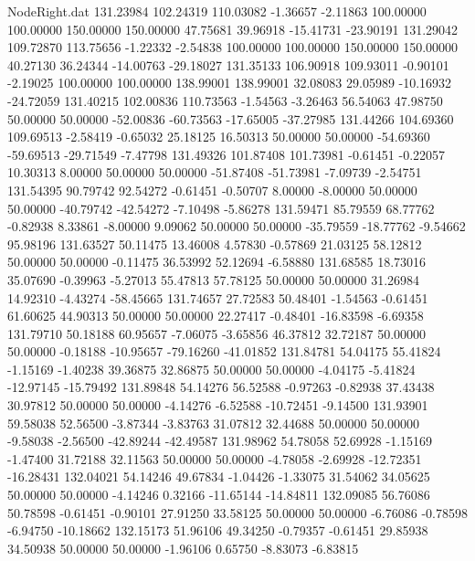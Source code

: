 \begin{filecontents}{NodeRight.dat}
 131.23984  102.24319  110.03082    -1.36657   -2.11863  100.00000  100.00000  150.00000  150.00000   47.75681   39.96918  -15.41731  -23.90191
 131.29042  109.72870  113.75656    -1.22332   -2.54838  100.00000  100.00000  150.00000  150.00000   40.27130   36.24344  -14.00763  -29.18027
 131.35133  106.90918  109.93011    -0.90101   -2.19025  100.00000  100.00000  138.99001  138.99001   32.08083   29.05989  -10.16932  -24.72059
 131.40215  102.00836  110.73563    -1.54563   -3.26463   56.54063   47.98750   50.00000   50.00000  -52.00836  -60.73563  -17.65005  -37.27985
 131.44266  104.69360  109.69513    -2.58419   -0.65032   25.18125   16.50313   50.00000   50.00000  -54.69360  -59.69513  -29.71549   -7.47798
 131.49326  101.87408  101.73981    -0.61451   -0.22057   10.30313    8.00000   50.00000   50.00000  -51.87408  -51.73981   -7.09739   -2.54751
 131.54395   90.79742   92.54272    -0.61451   -0.50707    8.00000   -8.00000   50.00000   50.00000  -40.79742  -42.54272   -7.10498   -5.86278
 131.59471   85.79559   68.77762    -0.82938    8.33861   -8.00000    9.09062   50.00000   50.00000  -35.79559  -18.77762   -9.54662   95.98196
 131.63527   50.11475   13.46008     4.57830   -0.57869   21.03125   58.12812   50.00000   50.00000   -0.11475   36.53992   52.12694   -6.58880
 131.68585   18.73016   35.07690    -0.39963   -5.27013   55.47813   57.78125   50.00000   50.00000   31.26984   14.92310   -4.43274  -58.45665
 131.74657   27.72583   50.48401    -1.54563   -0.61451   61.60625   44.90313   50.00000   50.00000   22.27417   -0.48401  -16.83598   -6.69358
 131.79710   50.18188   60.95657    -7.06075   -3.65856   46.37812   32.72187   50.00000   50.00000   -0.18188  -10.95657  -79.16260  -41.01852
 131.84781   54.04175   55.41824    -1.15169   -1.40238   39.36875   32.86875   50.00000   50.00000   -4.04175   -5.41824  -12.97145  -15.79492
 131.89848   54.14276   56.52588    -0.97263   -0.82938   37.43438   30.97812   50.00000   50.00000   -4.14276   -6.52588  -10.72451   -9.14500
 131.93901   59.58038   52.56500    -3.87344   -3.83763   31.07812   32.44688   50.00000   50.00000   -9.58038   -2.56500  -42.89244  -42.49587
 131.98962   54.78058   52.69928    -1.15169   -1.47400   31.72188   32.11563   50.00000   50.00000   -4.78058   -2.69928  -12.72351  -16.28431
 132.04021   54.14246   49.67834    -1.04426   -1.33075   31.54062   34.05625   50.00000   50.00000   -4.14246    0.32166  -11.65144  -14.84811
 132.09085   56.76086   50.78598    -0.61451   -0.90101   27.91250   33.58125   50.00000   50.00000   -6.76086   -0.78598   -6.94750  -10.18662
 132.15173   51.96106   49.34250    -0.79357   -0.61451   29.85938   34.50938   50.00000   50.00000   -1.96106    0.65750   -8.83073   -6.83815

\end{filecontents}
